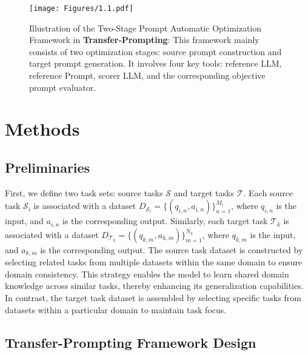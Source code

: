 
\begin{figure*}[!t]
\centering
\texttt{[image: Figures/1.1.pdf]}
\caption{Illustration of the Two-Stage Prompt Automatic Optimization Framework in \textbf{Transfer-Prompting}: This framework mainly consists of two optimization stages: source prompt construction and target prompt generation. It involves four key tools: reference LLM, reference Prompt, scorer LLM, and the corresponding objective prompt evaluator.
}
\label{fig1.1}
\end{figure*}



\section{Methods} \label{sec:3}

\subsection{Preliminaries}

First, we define two task sets: source tasks $\bm{\mathcal{S}}$ and target tasks $\bm{\mathcal{T}}$. Each source task $\mathcal{S}_i$ is associated with a dataset $D_{\mathcal{S}_i} = \{(q_{i,n}, a_{i,n})\}_{n=1}^{M_i}$, where $q_{i,n}$ is the input, and $a_{i,n}$ is the corresponding output. Similarly, each target task $\mathcal{T}_k$ is associated with a dataset $D_{\mathcal{T}_k} = \{(q_{k,m}, a_{k,m})\}_{m=1}^{N_k}$, where $q_{k,m}$ is the input, and $a_{k,m}$ is the corresponding  output.
The source task dataset is constructed by selecting related tasks from multiple datasets within the same domain to ensure domain consistency. This strategy enables the model to learn shared domain knowledge across similar tasks, thereby enhancing its generalization capabilities. In contrast, the target task dataset is assembled by selecting specific tasks from datasets within a particular domain to maintain task focus. 



\subsection{Transfer-Prompting Framework Design}

